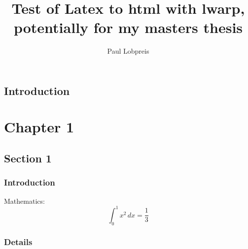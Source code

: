 \documentclass{book}
\begin{document}
\title{Test of Latex to html with lwarp, potentially for my masters thesis}
\author{Paul Lobpreis}

\HTMLTitleAfterSection
\maketitle

\label{table-of-contents}

\tableofcontents

\section[index]{Introduction}



\lipsum[1-3]

\chapter[chapter1]{Chapter 1}
\section[section1]{Section 1}
\lipsum[1-3]

\subsection{Introduction}
\lipsum[1-3]

Mathematics:
\[
    \int_0^1 x^2 \, dx = \frac{1}{3}    
\]

\subsection{Details}
\lipsum[4]

\end{document}
